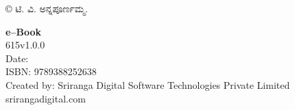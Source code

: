 \thispagestyle{empty}

© ಟಿ. ವಿ. ಅನ್ನಪೂರ್ಣಮ್ಮ.

 \textbf{e–Book}\\
 615v1.0.0\\
 Date:\\
 ISBN: 9789388252638\\
 Created by: Sriranga Digital Software Technologies Private Limited\\
 srirangadigital.com


